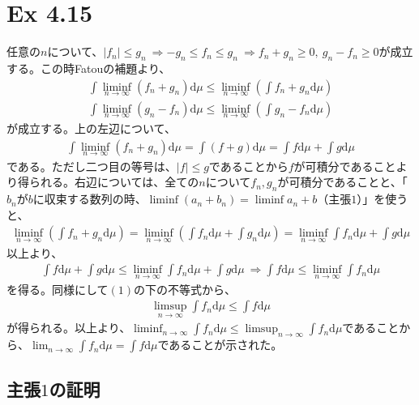 \documentclass{article}
\begin{document}
\section{Ex 4.15}
任意の$n$について、$\left| f_n \right| \leq g_n\ \Rightarrow -g_n \leq f_n \leq g_n\ \Rightarrow f_n + g_n \geq 0,\ g_n -f_n \geq 0$が成立する。この時Fatouの補題より、
\begin{align}
	\int \liminf_{n\to \infty} (f_n + g_n) \mathrm{d}\mu \leq \liminf_{n\to \infty}\left( \int f_n + g_n \mathrm{d}\mu\right)\\
	\int \liminf_{n\to \infty} (g_n - f_n) \mathrm{d}\mu \leq \liminf_{n\to \infty}\left(  \int g_n - f_n \mathrm{d}\mu\right)
\end{align}
が成立する。上の左辺について、
\begin{align*}
	\int \liminf_{n\to \infty}( f_n + g_n) \mathrm{d}\mu = \int (f + g) \mathrm{d}\mu = \int f \mathrm{d}\mu + \int g \mathrm{d}\mu
\end{align*}
である。ただし二つ目の等号は、$|f| \leq g$であることから$f$が可積分であることより得られる。右辺については、全ての$n$について$f_n, g_n$が可積分であることと、「$b_n$が$b$に収束する数列の時、$\liminf (a_n + b_n) = \liminf a_n + b$（主張$1$）」を使うと、
\begin{align*}
	\liminf_{n\to \infty} \left(  \int f_n + g_n \mathrm{d}\mu\right) = \liminf_{n \to \infty} \left( \int f_n \mathrm{d}\mu + \int g_n \mathrm{d}\mu \right) = \liminf_{n \to \infty} \int f_n \mathrm{d}\mu + \int g \mathrm{d}\mu
\end{align*}
以上より、
\begin{align*}
	\int f \mathrm{d}\mu + \int g \mathrm{d}\mu \leq  \liminf_{n \to \infty} \int f_n \mathrm{d}\mu + \int g \mathrm{d}\mu\ \Rightarrow \int f \mathrm{d}\mu \leq \liminf_{n \to \infty} \int f_n \mathrm{d}\mu
\end{align*}
を得る。同様にして$(1)$の下の不等式から、
\begin{align*}
	\limsup_{n \to \infty} \int f_n \mathrm{d}\mu \leq \int f \mathrm{d}\mu
\end{align*}
が得られる。以上より、$\liminf_{n \to \infty} \int f_n \mathrm{d}\mu \leq \limsup_{n \to \infty} \int f_n \mathrm{d}\mu$であることから、$\lim_{n \to \infty} \int f_n \mathrm{d}\mu = \int f \mathrm{d}\mu$であることが示された。

\subsection{主張$1$の証明}
\end{document}
